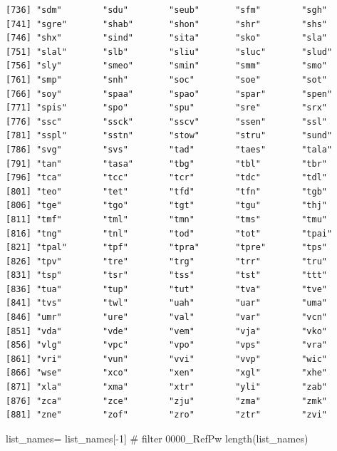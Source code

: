 \documentclass[
  letterpaper,
  DIV=11,
  numbers=noendperiod]{scrreprt}
\newenvironment{Shaded}{\begin{snugshade}}{\end{snugshade}}
\newcommand{\CommentTok}[1]{\textcolor[rgb]{0.37,0.37,0.37}{#1}}
\newcommand{\DecValTok}[1]{\textcolor[rgb]{0.68,0.00,0.00}{#1}}
\newcommand{\FunctionTok}[1]{\textcolor[rgb]{0.28,0.35,0.67}{#1}}
\newcommand{\NormalTok}[1]{\textcolor[rgb]{0.00,0.23,0.31}{#1}}
\newcommand{\OtherTok}[1]{\textcolor[rgb]{0.00,0.23,0.31}{#1}}
\newcommand{\SpecialCharTok}[1]{\textcolor[rgb]{0.37,0.37,0.37}{#1}}
\begin{document}
\begin{verbatim}
[736] "sdm"        "sdu"        "seub"       "sfm"        "sgh"       
[741] "sgre"       "shab"       "shon"       "shr"        "shs"       
[746] "shx"        "sind"       "sita"       "sko"        "sla"       
[751] "slal"       "slb"        "sliu"       "sluc"       "slud"      
[756] "sly"        "smeo"       "smin"       "smm"        "smo"       
[761] "smp"        "snh"        "soc"        "soe"        "sot"       
[766] "soy"        "spaa"       "spao"       "spar"       "spen"      
[771] "spis"       "spo"        "spu"        "sre"        "srx"       
[776] "ssc"        "ssck"       "sscv"       "ssen"       "ssl"       
[781] "sspl"       "sstn"       "stow"       "stru"       "sund"      
[786] "svg"        "svs"        "tad"        "taes"       "tala"      
[791] "tan"        "tasa"       "tbg"        "tbl"        "tbr"       
[796] "tca"        "tcc"        "tcr"        "tdc"        "tdl"       
[801] "teo"        "tet"        "tfd"        "tfn"        "tgb"       
[806] "tge"        "tgo"        "tgt"        "tgu"        "thj"       
[811] "tmf"        "tml"        "tmn"        "tms"        "tmu"       
[816] "tng"        "tnl"        "tod"        "tot"        "tpai"      
[821] "tpal"       "tpf"        "tpra"       "tpre"       "tps"       
[826] "tpv"        "tre"        "trg"        "trr"        "tru"       
[831] "tsp"        "tsr"        "tss"        "tst"        "ttt"       
[836] "tua"        "tup"        "tut"        "tva"        "tve"       
[841] "tvs"        "twl"        "uah"        "uar"        "uma"       
[846] "umr"        "ure"        "val"        "var"        "vcn"       
[851] "vda"        "vde"        "vem"        "vja"        "vko"       
[856] "vlg"        "vpc"        "vpo"        "vps"        "vra"       
[861] "vri"        "vun"        "vvi"        "vvp"        "wic"       
[866] "wse"        "xco"        "xen"        "xgl"        "xhe"       
[871] "xla"        "xma"        "xtr"        "yli"        "zab"       
[876] "zca"        "zce"        "zju"        "zma"        "zmk"       
[881] "zne"        "zof"        "zro"        "ztr"        "zvi"       
\end{verbatim}

\begin{Shaded}
\begin{Highlighting}[]
\NormalTok{list\_names}\OtherTok{=}\NormalTok{ list\_names[}\SpecialCharTok{{-}}\DecValTok{1}\NormalTok{] }\CommentTok{\# filter 0000\_RefPw}
\FunctionTok{length}\NormalTok{(list\_names)}
\end{Highlighting}
\end{Shaded}
\end{document}
